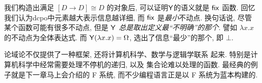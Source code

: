 我们构造出满足 \([D \to D] \cong D\) 的对象后,
可以证明\(\textnormal{\textsf{Y}}\)的语义就是 \(\textnormal{\textsf{fix}}\) 函数.
回忆我们认为dcpo中元素越大表示信息越详细,
而 \(\textnormal{\textsf{fix}}\) 是\emph{最小}不动点. 换句话说, 尽管
某个函数可能有很多不动点, 但是 \(\textnormal{\textsf{Y}}\)
\emph{总是取出定义最“不明确”的那个}. 譬如 \(\lambda x.x\)
的不动点为全体表达式. 而 \(\textnormal{\textsf{Y}}(\lambda x. x) = \Omega\),
选出了信息“最少”的那个, 即 \(\bot\).

论域论不仅提供了一种框架, 还将计算机科学、数学与逻辑学联系
起来. 特别是计算机科学中经常需要处理不停机的递归, 以及
集合论难以处理的函数. 最经典的例子就是下一章马上会介绍的
F 系统, 而不少编程语言正是以 F 系统为蓝本构建的.
